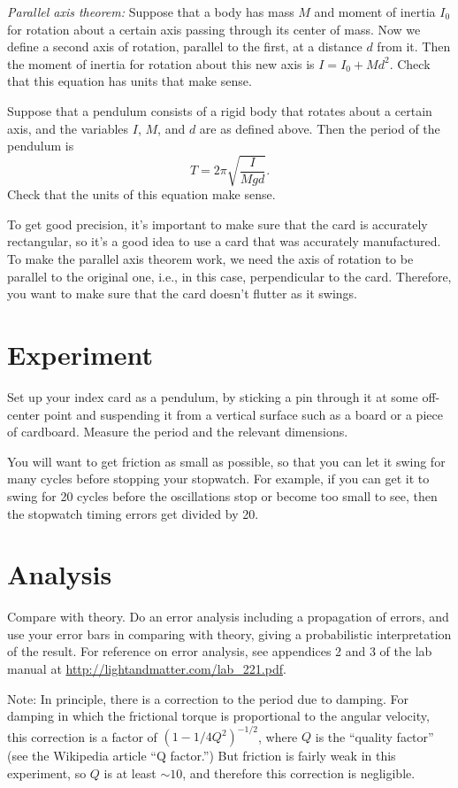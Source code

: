\emph{Parallel axis theorem:} Suppose that a body has mass $M$ and moment of inertia $I_0$ for rotation about a certain axis passing
through its center of mass. Now we define a second axis of rotation, parallel to the first, at a distance $d$ from it.
Then the moment of inertia for rotation about this new axis is $I=I_0+Md^2$.
Check that this equation has units that make sense.

Suppose that a pendulum consists of a rigid body that rotates about a certain axis, and the variables $I$, $M$, and $d$ are
as defined above. Then the period of the pendulum is
\begin{equation*}
  T = 2\pi \sqrt{\frac{I}{Mgd}}.
\end{equation*}
Check that the units of this equation make sense.

To get good precision, it's important to make sure that the card is accurately rectangular, so it's a good
idea to use a card that was accurately manufactured. To make the parallel axis theorem work, we need the
axis of rotation to be parallel to the original one, i.e., in this case, perpendicular to the card. Therefore,
you want to make sure that the card doesn't flutter as it swings.

\section*{Experiment}
Set up your index card as a pendulum, by sticking a pin through it at some off-center point and
suspending it from a vertical surface such as a board or a piece of cardboard. Measure the period
and the relevant dimensions.

You will want to get friction as small as possible, so that you can let it swing for many cycles
before stopping your stopwatch. For example, if you can get it to swing for 20 cycles before the
oscillations stop or become too small to see, then the stopwatch timing errors get divided by 20.

\section*{Analysis}
Compare with theory. Do an error analysis including a propagation of errors, and use your
error bars in comparing with theory, giving a probabilistic interpretation of the result.
For reference on error analysis, see appendices 2 and 3 of the lab manual at
\url{http://lightandmatter.com/lab_221.pdf}.

Note: In principle, there is a correction to the period due to damping. For damping in which
the frictional torque is proportional to the angular velocity, this correction is
a factor of $(1-1/4Q^2)^{-1/2}$, where $Q$ is the ``quality factor'' (see the Wikipedia
article ``Q factor.'') But friction is fairly weak in this experiment, so $Q$ is at least
$\sim 10$, and therefore this correction is negligible.
